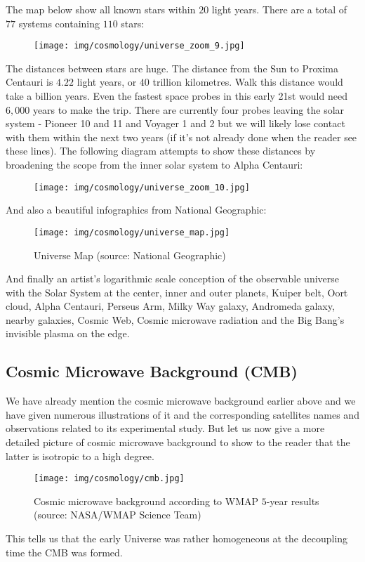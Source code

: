 \begin{enumerate}
		The map below show all known stars within $20$ light years. There are a total of $77$ systems containing $110$ stars:
		\begin{figure}[H]
			\centering
			\texttt{[image: img/cosmology/universe\_zoom\_9.jpg]}
		\end{figure}
		The distances between stars are huge. The distance from the Sun to Proxima Centauri is $4.22$ light years, or $40$ trillion kilometres. Walk this distance would take a billion years. Even the fastest space probes in this early 21st would need $6,000$ years to make the trip. There are currently four probes leaving the solar system - Pioneer 10 and 11 and Voyager 1 and 2 but we will likely lose contact with them within the next two years (if it's not already done when the reader see these lines). The following diagram attempts to show these distances by broadening the scope from the inner solar system to Alpha Centauri:
	\begin{figure}[H]
		\centering
		\texttt{[image: img/cosmology/universe\_zoom\_10.jpg]}
		\end{figure}
	\end{enumerate}
	And also a beautiful infographics from National Geographic:
	\begin{figure}[H]
		\centering
		\texttt{[image: img/cosmology/universe\_map.jpg]}
		\caption[Universe Map]{Universe Map (source: National Geographic)}
	\end{figure}
	And finally an artist's logarithmic scale conception of the observable universe with the Solar System at the center, inner and outer planets, Kuiper belt, Oort cloud, Alpha Centauri, Perseus Arm, Milky Way galaxy, Andromeda galaxy, nearby galaxies, Cosmic Web, Cosmic microwave radiation and the Big Bang's invisible plasma on the edge.
	
	
	\pagebreak
	\subsection{Cosmic Microwave Background (CMB)}\label{cosmic microwave background}
	We have already mention the cosmic microwave background earlier above and we have given numerous illustrations of it and the corresponding satellites names and observations related to its experimental study. But let us now give a more detailed picture of cosmic microwave background to show to the reader that the latter is isotropic to a high degree. 
	\begin{figure}[H]
		\centering
		\texttt{[image: img/cosmology/cmb.jpg]}
		\caption[Cosmic microwave background according to WMAP $5$-year results]{Cosmic microwave background according to WMAP $5$-year results (source: NASA/WMAP Science Team)}
	\end{figure}
	This tells us that the early Universe was rather homogeneous at the decoupling time the CMB was formed.
	
